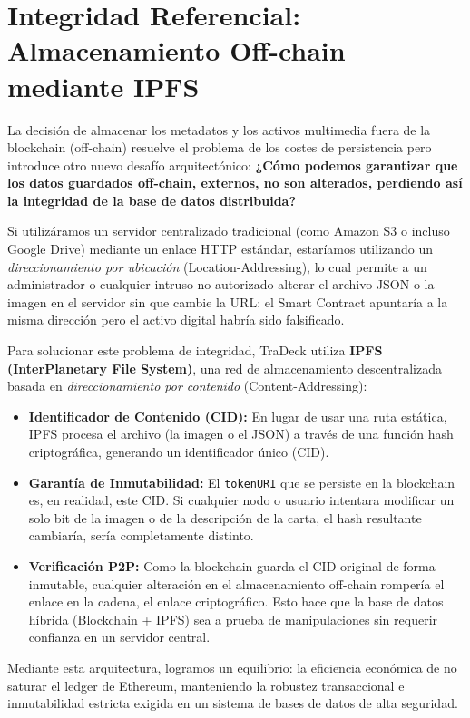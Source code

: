 \section{Integridad Referencial: Almacenamiento Off-chain mediante IPFS}

La decisión de almacenar los metadatos y los activos multimedia fuera de la blockchain (off-chain) resuelve el problema de los costes de persistencia pero introduce otro nuevo desafío arquitectónico: \textbf{¿Cómo podemos garantizar que los datos guardados off-chain, externos, no son alterados, perdiendo así la integridad de la base de datos distribuida?}

Si utilizáramos un servidor centralizado tradicional (como Amazon S3 o incluso Google Drive) mediante un enlace HTTP estándar, estaríamos utilizando un \textit{direccionamiento por ubicación} (Location-Addressing), lo cual permite a un administrador o cualquier intruso no autorizado alterar el archivo JSON o la imagen en el servidor sin que cambie la URL: el Smart Contract apuntaría a la misma dirección pero el activo digital habría sido falsificado.

Para solucionar este problema de integridad, TraDeck utiliza \textbf{IPFS (InterPlanetary File System)}, una red de almacenamiento descentralizada basada en \textit{direccionamiento por contenido} (Content-Addressing):

\begin{itemize}
	\item \textbf{Identificador de Contenido (CID):} En lugar de usar una ruta estática, IPFS procesa el archivo (la imagen o el JSON) a través de una función hash criptográfica, generando un identificador único (CID).
	\item \textbf{Garantía de Inmutabilidad:} El \texttt{tokenURI} que se persiste en la blockchain es, en realidad, este CID. Si cualquier nodo o usuario intentara modificar un solo bit de la imagen o de la descripción de la carta, el hash resultante cambiaría, sería completamente distinto. 
	\item \textbf{Verificación P2P:} Como la blockchain guarda el CID original de forma inmutable, cualquier alteración en el almacenamiento off-chain rompería el enlace en la cadena, el enlace criptográfico. Esto hace que la base de datos híbrida (Blockchain + IPFS) sea a prueba de manipulaciones sin requerir confianza en un servidor central.
\end{itemize}

Mediante esta arquitectura, logramos un equilibrio: la eficiencia económica de no saturar el ledger de Ethereum, manteniendo la robustez transaccional e inmutabilidad estricta exigida en un sistema de bases de datos de alta seguridad.

